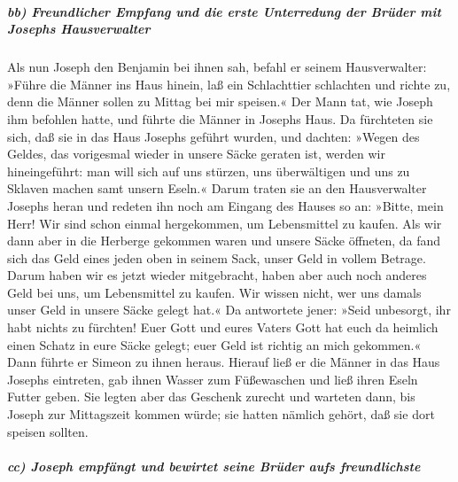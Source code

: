 \hypertarget{bb-freundlicher-empfang-und-die-erste-unterredung-der-bruxfcder-mit-josephs-hausverwalter}{%
\subparagraph{bb) Freundlicher Empfang und die erste Unterredung der
Brüder mit Josephs
Hausverwalter}\label{bb-freundlicher-empfang-und-die-erste-unterredung-der-bruxfcder-mit-josephs-hausverwalter}}

 Als nun Joseph den Benjamin bei ihnen sah, befahl er
seinem Hausverwalter: »Führe die Männer ins Haus hinein, laß ein
Schlachttier schlachten und richte zu, denn die Männer sollen zu Mittag
bei mir speisen.«  Der Mann tat, wie Joseph ihm befohlen
hatte, und führte die Männer in Josephs Haus.  Da
fürchteten sie sich, daß sie in das Haus Josephs geführt wurden, und
dachten: »Wegen des Geldes, das vorigesmal wieder in unsere Säcke
geraten ist, werden wir hineingeführt: man will sich auf uns stürzen,
uns überwältigen und uns zu Sklaven machen samt unsern Eseln.«
 Darum traten sie an den Hausverwalter Josephs heran und
redeten ihn noch am Eingang des Hauses so an:  »Bitte,
mein Herr! Wir sind schon einmal hergekommen, um Lebensmittel zu kaufen.
 Als wir dann aber in die Herberge gekommen waren und
unsere Säcke öffneten, da fand sich das Geld eines jeden oben in seinem
Sack, unser Geld in vollem Betrage. Darum haben wir es jetzt wieder
mitgebracht,  haben aber auch noch anderes Geld bei uns,
um Lebensmittel zu kaufen. Wir wissen nicht, wer uns damals unser Geld
in unsere Säcke gelegt hat.«  Da antwortete jener: »Seid
unbesorgt, ihr habt nichts zu fürchten! Euer Gott und eures Vaters Gott
hat euch da heimlich einen Schatz in eure Säcke gelegt; euer Geld ist
richtig an mich gekommen.« Dann führte er Simeon zu ihnen heraus.
 Hierauf ließ er die Männer in das Haus Josephs
eintreten, gab ihnen Wasser zum Füßewaschen und ließ ihren Eseln Futter
geben.  Sie legten aber das Geschenk zurecht und warteten
dann, bis Joseph zur Mittagszeit kommen würde; sie hatten nämlich
gehört, daß sie dort speisen sollten.

\hypertarget{cc-joseph-empfuxe4ngt-und-bewirtet-seine-bruxfcder-aufs-freundlichste}{%
\subparagraph{cc) Joseph empfängt und bewirtet seine Brüder aufs
freundlichste}\label{cc-joseph-empfuxe4ngt-und-bewirtet-seine-bruxfcder-aufs-freundlichste}}

